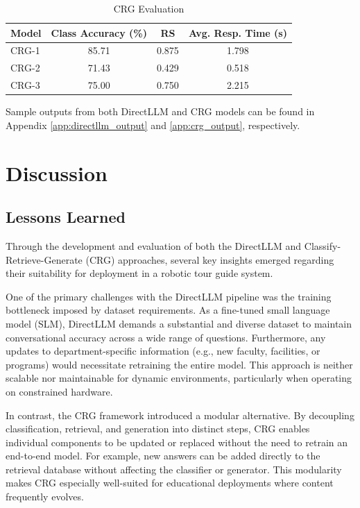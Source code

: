 \documentclass[conference]{IEEEtran}
\begin{document}
\begin{table}[!ht]
    \centering
    \caption{CRG Evaluation}
    \label{tab:crg_results}
    \begin{tabular}{l|c|c|c}
        \toprule
        \textbf{Model} & \textbf{Class Accuracy (\%)} & \textbf{RS} & \textbf{Avg. Resp. Time (s)} \\
        \midrule
        CRG-1 & 85.71 & 0.875 & 1.798 \\
        CRG-2 & 71.43 & 0.429 & 0.518 \\
        CRG-3 & 75.00 & 0.750 & 2.215 \\
        \bottomrule
    \end{tabular}
\end{table}

Sample outputs from both DirectLLM and CRG models can be found in Appendix \ref{app:directllm_output} and \ref{app:crg_output}, respectively.

\section{Discussion}
\subsection{Lessons Learned}
Through the development and evaluation of both the DirectLLM and Classify-Retrieve-Generate (CRG) approaches, several key insights emerged regarding their suitability for deployment in a robotic tour guide system.

One of the primary challenges with the DirectLLM pipeline was the training bottleneck imposed by dataset requirements. 
As a fine-tuned small language model (SLM), DirectLLM demands a substantial and diverse dataset to maintain conversational accuracy across a wide range of questions. 
Furthermore, any updates to department-specific information (e.g., new faculty, facilities, or programs) would necessitate retraining the entire model. 
This approach is neither scalable nor maintainable for dynamic environments, particularly when operating on constrained hardware.

In contrast, the CRG framework introduced a modular alternative. 
By decoupling classification, retrieval, and generation into distinct steps, CRG enables individual components to be updated or replaced without the need to retrain an end-to-end model. 
For example, new answers can be added directly to the retrieval database without affecting the classifier or generator. 
This modularity makes CRG especially well-suited for educational deployments where content frequently evolves.
\end{document}
